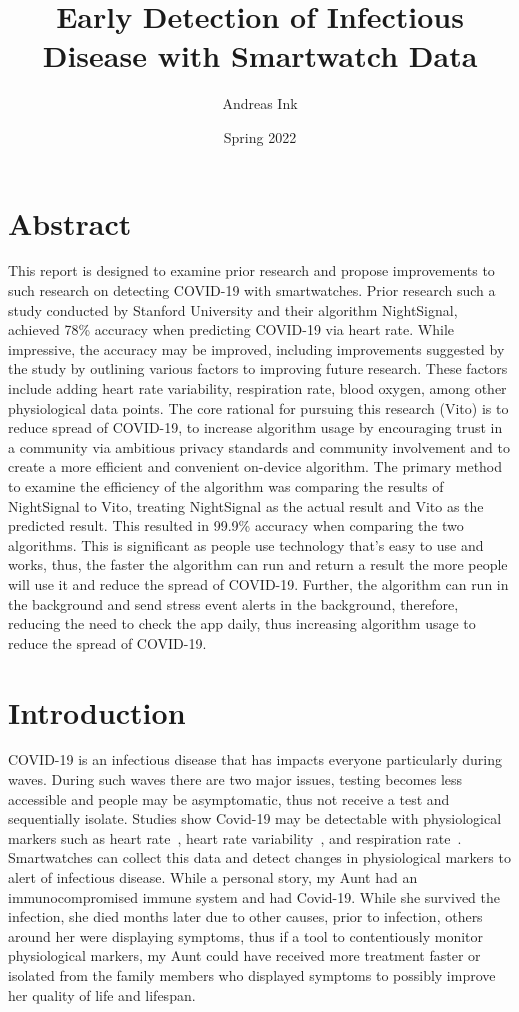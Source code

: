 \documentclass{article}
\title{Early Detection of Infectious Disease with Smartwatch Data}
\author{Andreas Ink}
\date{Spring 2022}
\begin{document}
\maketitle
\section{Abstract}


This report is designed to examine prior research and propose improvements to such research on detecting COVID-19 with smartwatches.  Prior research such a study conducted by Stanford University and their algorithm NightSignal, achieved 78\% accuracy when predicting COVID-19 via heart rate.  While impressive, the accuracy may be improved, including improvements suggested by the study by outlining various factors to improving future research.  These factors include adding heart rate variability, respiration rate, blood oxygen, among other physiological data points.  The core rational for pursuing this research (Vito) is to reduce spread of COVID-19, to increase algorithm usage by encouraging trust in a community via ambitious privacy standards and community involvement and to create a more efficient and convenient on-device algorithm.  The primary method to examine the efficiency of the algorithm was comparing the results of NightSignal to Vito, treating NightSignal as the actual result and Vito as the predicted result.  This resulted in 99.9\% accuracy when comparing the two algorithms. This is significant as people use technology that's easy to use and works, thus, the faster the algorithm can run and return a result the more people will use it and reduce the spread of COVID-19.  Further, the algorithm can run in the background and send stress event alerts in the background, therefore, reducing the need to check the app daily, thus increasing algorithm usage to reduce the spread of COVID-19.

\section{Introduction}

COVID-19 is an infectious disease that has impacts everyone particularly during waves.  During such waves there are two major issues, testing becomes less accessible and people may be asymptomatic, thus not receive a test and sequentially isolate.  Studies show Covid-19 may be detectable with physiological markers such as heart rate~\cite{NightSignal}, heart rate variability~\cite{hrv}, and respiration rate~\cite{vital}. Smartwatches can collect this data and detect changes in physiological markers to alert of infectious disease.  While a personal story, my Aunt had an immunocompromised immune system and had Covid-19.  While she survived the infection, she died months later due to other causes, prior to infection, others around her were displaying symptoms, thus if a tool to contentiously monitor physiological markers, my Aunt could have received more treatment faster or isolated from the family members who displayed symptoms to possibly improve her quality of life and lifespan.  
\end{document}
